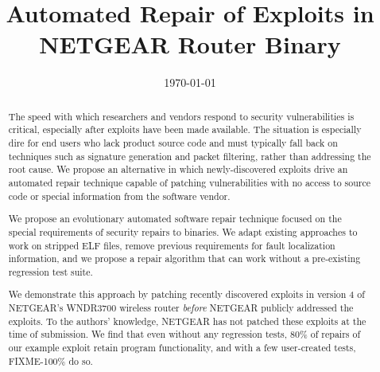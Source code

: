 \documentclass{sigcomm-alternate}
\date{\today}
\title{Automated Repair of Exploits in NETGEAR Router Binary}
\begin{document}
\maketitle
\usetikzlibrary{arrows,decorations,decorations.pathreplacing,shapes}

\begin{abstract}
The speed with which researchers and vendors respond to security
vulnerabilities is critical, especially after exploits have been made
available. The situation is especially dire for end users who lack
product source code and must typically fall back on techniques such as
signature generation and packet filtering, rather than addressing the root
cause. We propose an alternative in which newly-discovered exploits drive
an automated repair technique capable of patching vulnerabilities with no
access to source code or special information from the software vendor.

We propose an evolutionary automated software repair technique focused on
the special requirements of security repairs to binaries.  We adapt 
existing approaches to work on stripped ELF files, remove previous 
requirements for fault localization information, and we propose a
repair algorithm that can work without a pre-existing regression test
suite. 

We demonstrate this approach by patching recently discovered exploits
in version 4 of NETGEAR's WNDR3700 wireless router \emph{before} NETGEAR
publicly addressed the exploits. To the authors' knowledge, NETGEAR has not
patched these exploits at the time of submission. We find that even without
any regression tests, 80\% of repairs of our example exploit retain program
functionality, and with a few user-created tests, FIXME-100\% do so. 

\end{abstract}
\end{document}
